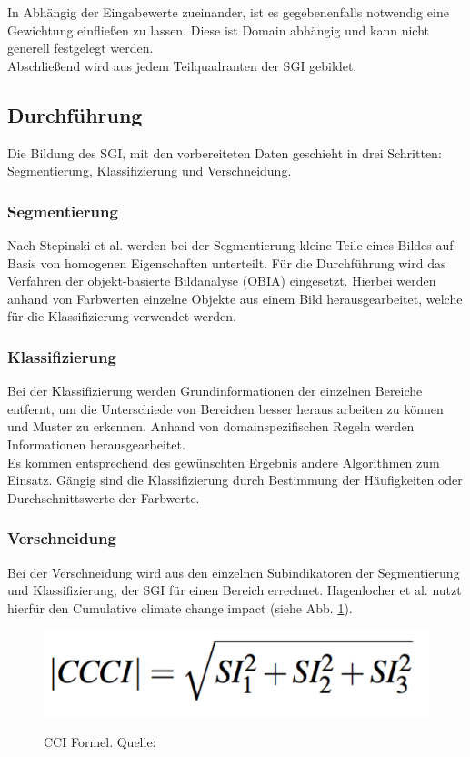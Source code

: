 \documentclass[10pt,conference,compsocconf]{IEEEtran}
\begin{document}
 In Abhängig der Eingabewerte zueinander, ist es gegebenenfalls notwendig eine Gewichtung einfließen zu lassen. Diese ist Domain abhängig und kann nicht generell festgelegt werden.\\
 Abschließend wird aus jedem Teilquadranten der SGI gebildet.\\


\subsection{Durchführung}
Die Bildung des SGI, mit den vorbereiteten Daten geschieht in drei Schritten: Segmentierung, Klassifizierung und Verschneidung.

\subsubsection{Segmentierung}
Nach Stepinski et al. \cite{stepinski2006automatic} werden bei der Segmentierung kleine Teile eines Bildes auf Basis von homogenen Eigenschaften unterteilt. Für die Durchführung wird das Verfahren der objekt-basierte Bildanalyse (OBIA) \cite{hay2006object} eingesetzt. Hierbei werden anhand von Farbwerten einzelne Objekte aus einem Bild herausgearbeitet, welche für die Klassifizierung verwendet werden.


\subsubsection{Klassifizierung}
Bei der Klassifizierung werden Grundinformationen der einzelnen Bereiche entfernt, um die Unterschiede von Bereichen besser heraus arbeiten zu können und Muster zu erkennen. Anhand von domainspezifischen Regeln werden Informationen herausgearbeitet.\\
Es kommen entsprechend des gewünschten Ergebnis andere Algorithmen zum Einsatz. Gängig sind die Klassifizierung durch Bestimmung der Häufigkeiten oder Durchschnittswerte der Farbwerte.


\subsubsection{Verschneidung}
Bei der Verschneidung wird aus den einzelnen Subindikatoren der Segmentierung und Klassifizierung, der SGI für einen Bereich errechnet. Hagenlocher et al. \cite{hagenlocher2014modeling} nutzt hierfür den Cumulative climate change impact (siehe Abb. \ref{img:CCI_Formel}).
\begin{figure}[H]
	\centering
	\includegraphics[width=0.5\columnwidth]{img/CCI_Formel.png} \\
	\caption[]{CCI Formel. Quelle: \cite{hagenlocher2014modeling}}
	\label{img:CCI_Formel}
\end{figure}
\end{document}
